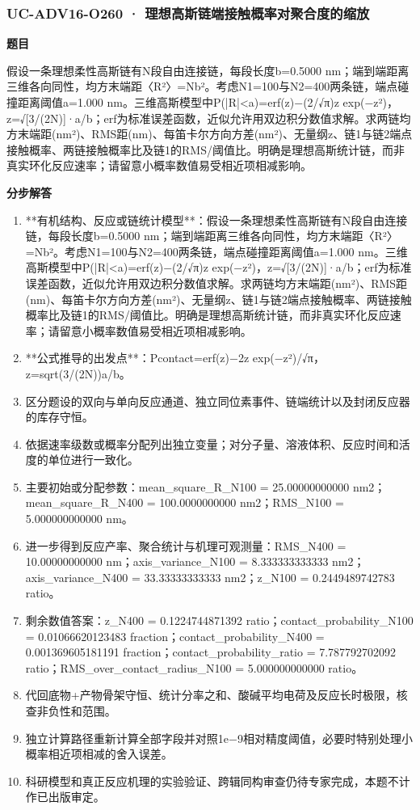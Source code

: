 \documentclass[UTF8,11pt,a4paper]{ctexart}
\begin{document}
\subsubsection*{UC-ADV16-O260 · 理想高斯链端接触概率对聚合度的缩放}
\noindent\textbf{题目}\par
假设一条理想柔性高斯链有N段自由连接链，每段长度b=0.5000 nm；端到端距离三维各向同性，均方末端距〈R²〉=Nb²。考虑N1=100与N2=400两条链，端点碰撞距离阈值a=1.000 nm。三维高斯模型中P(|R|<a)=erf(z)−(2/√π)z exp(−z²)，z=√[3/(2N)]·a/b；erf为标准误差函数，近似允许用双边积分数值求解。求两链均方末端距(nm²)、RMS距(nm)、每笛卡尔方向方差(nm²)、无量纲z、链1与链2端点接触概率、两链接触概率比及链1的RMS/阈值比。明确是理想高斯统计链，而非真实环化反应速率；请留意小概率数值易受相近项相减影响。\par
\medskip\noindent\textbf{分步解答}
\begin{enumerate}
\item **有机结构、反应或链统计模型**：假设一条理想柔性高斯链有N段自由连接链，每段长度b=0.5000 nm；端到端距离三维各向同性，均方末端距〈R²〉=Nb²。考虑N1=100与N2=400两条链，端点碰撞距离阈值a=1.000 nm。三维高斯模型中P(|R|<a)=erf(z)−(2/√π)z exp(−z²)，z=√[3/(2N)]·a/b；erf为标准误差函数，近似允许用双边积分数值求解。求两链均方末端距(nm²)、RMS距(nm)、每笛卡尔方向方差(nm²)、无量纲z、链1与链2端点接触概率、两链接触概率比及链1的RMS/阈值比。明确是理想高斯统计链，而非真实环化反应速率；请留意小概率数值易受相近项相减影响。
\item **公式推导的出发点**：Pcontact=erf(z)−2z exp(−z²)/√π，z=sqrt(3/(2N))a/b。
\item 区分题设的双向与单向反应通道、独立同位素事件、链端统计以及封闭反应器的库存守恒。
\item 依据速率级数或概率分配列出独立变量；对分子量、溶液体积、反应时间和活度的单位进行一致化。
\item 主要初始或分配参数：mean\_square\_R\_N100 = 25.00000000000 nm2；mean\_square\_R\_N400 = 100.0000000000 nm2；RMS\_N100 = 5.000000000000 nm。
\item 进一步得到反应产率、聚合统计与机理可观测量：RMS\_N400 = 10.00000000000 nm；axis\_variance\_N100 = 8.333333333333 nm2；axis\_variance\_N400 = 33.33333333333 nm2；z\_N100 = 0.2449489742783 ratio。
\item 剩余数值答案：z\_N400 = 0.1224744871392 ratio；contact\_probability\_N100 = 0.01066620123483 fraction；contact\_probability\_N400 = 0.001369605181191 fraction；contact\_probability\_ratio = 7.787792702092 ratio；RMS\_over\_contact\_radius\_N100 = 5.000000000000 ratio。
\item 代回底物+产物骨架守恒、统计分率之和、酸碱平均电荷及反应长时极限，核查非负性和范围。
\item 独立计算路径重新计算全部字段并对照1e−9相对精度阈值，必要时特别处理小概率相近项相减的舍入误差。
\item 科研模型和真正反应机理的实验验证、跨辑同构审查仍待专家完成，本题不计作已出版审定。
\end{enumerate}
\end{document}
